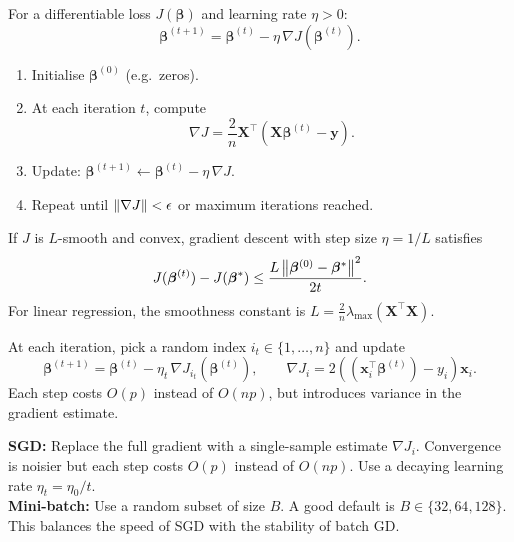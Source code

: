 \begin{definition}
For a differentiable loss $J(\bm{\beta})$ and learning rate $\eta > 0$:
\[
    \bm{\beta}^{(t+1)} = \bm{\beta}^{(t)} - \eta\,\nabla J(\bm{\beta}^{(t)}).
\]
\end{definition}

\begin{algorithme}[title=\textbf{Batch Gradient Descent for Linear Regression}]
\begin{enumerate}
    \item Initialise $\bm{\beta}^{(0)}$ (e.g.\ zeros).
    \item At each iteration $t$, compute
    \[
        \nabla J = \frac{2}{n}\bm{X}^\top(\bm{X}\bm{\beta}^{(t)} - \bm{y}).
    \]
    \item Update: $\bm{\beta}^{(t+1)} \leftarrow \bm{\beta}^{(t)} - \eta\,\nabla J$.
    \item Repeat until $\left\| \nabla J \right\| < \epsilon$ or maximum iterations reached.
\end{enumerate}
\end{algorithme}

\begin{theorem}
If $J$ is $L$-smooth and convex, gradient descent with step size $\eta = 1/L$ satisfies
\[
    J(\bm{\beta}^{(t)}) - J(\bm{\beta}^*) \leq \frac{L\left\| \bm{\beta}^{(0)} - \bm{\beta}^* \right\|^2}{2t}.
\]
For linear regression, the smoothness constant is $L = \frac{2}{n}\lambda_{\max}(\bm{X}^\top\bm{X})$.
\end{theorem}

\begin{definition}
At each iteration, pick a random index $i_t \in \{1,\ldots,n\}$ and update
\[
    \bm{\beta}^{(t+1)} = \bm{\beta}^{(t)} - \eta_t\,\nabla J_{i_t}(\bm{\beta}^{(t)}),
    \qquad \nabla J_i = 2((\bm{x}_i^\top\bm{\beta}^{(t)}) - y_i)\bm{x}_i.
\]
Each step costs $O(p)$ instead of $O(np)$, but introduces variance in the gradient estimate.
\end{definition}

\begin{bestpractice}[title=\textbf{Stochastic and Mini-Batch Variants}]
\textbf{SGD:} Replace the full gradient with a single-sample estimate $\nabla J_i$. Convergence is noisier but each step costs $O(p)$ instead of $O(np)$. Use a decaying learning rate $\eta_t = \eta_0 / t$.\\[3pt]
\textbf{Mini-batch:} Use a random subset of size $B$. A good default is $B \in \{32, 64, 128\}$. This balances the speed of SGD with the stability of batch GD.
\end{bestpractice}

